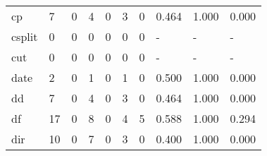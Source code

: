 \begin{longtable}{lp{1.3cm}p{1.3cm}p{1.3cm}p{1.3cm}p{1.3cm}p{1.3cm}p{1.3cm}p{1.3cm}p{1.3cm}}
cp        &                      7 &                                  0 &                                 4 &                                0 &                                 3 &                               0 &                                0.464 &                                  1.000 &                                0.000 \\
csplit    &                      0 &                                  0 &                                 0 &                                0 &                                 0 &                               0 &                                    - &                                      - &                                    - \\
cut       &                      0 &                                  0 &                                 0 &                                0 &                                 0 &                               0 &                                    - &                                      - &                                    - \\
date      &                      2 &                                  0 &                                 1 &                                0 &                                 1 &                               0 &                                0.500 &                                  1.000 &                                0.000 \\
dd        &                      7 &                                  0 &                                 4 &                                0 &                                 3 &                               0 &                                0.464 &                                  1.000 &                                0.000 \\
df        &                     17 &                                  0 &                                 8 &                                0 &                                 4 &                               5 &                                0.588 &                                  1.000 &                                0.294 \\
dir       &                     10 &                                  0 &                                 7 &                                0 &                                 3 &                               0 &                                0.400 &                                  1.000 &                                0.000 \\

\end{longtable}

